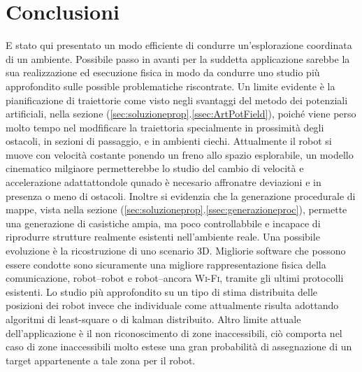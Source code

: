 \section{Conclusioni}
\label{sec:conclusioni}
E stato qui presentato un modo efficiente di condurre un'esplorazione coordinata
di un ambiente.
Possibile passo in avanti per la suddetta applicazione sarebbe la sua
realizzazione ed esecuzione fisica in modo da condurre uno studio più
approfondito sulle possible problematiche riscontrate.
Un limite evidente è la pianificazione di traiettorie come visto negli svantaggi
del metodo dei potenziali artificiali, nella sezione
(\ref{sec:soluzioneprop}.\ref{ssec:ArtPotField}), poiché viene perso molto tempo
nel modfificare la traiettoria specialmente in prossimità degli ostacoli,
in sezioni di passaggio, e in ambienti ciechi.
Attualmente il robot si muove con velocità costante ponendo un freno allo spazio
esplorabile, un modello cinematico milgiaore permetterebbe lo studio del cambio
di velocità e accelerazione adattattondole qunado è necesario affronatre
deviazioni e in presenza o meno di ostacoli.
Inoltre si evidenzia che la generazione procedurale di mappe, vista nella
sezione (\ref{sec:soluzioneprop}.\ref{ssec:generazioneproc}), permette una
generazione di casistiche ampia, ma poco controllabbile e incapace di riprodurre
strutture realmente esistenti nell'ambiente reale.
Una possibile evoluzione è la ricostruzione di uno scenario 3D.
Migliorie software che possono essere condotte sono sicuramente una migliore
rappresentazione fisica della comunicazione, robot--robot  e robot--ancora
\textsc{Wi-Fi}, tramite gli ultimi protocolli esistenti.
Lo studio più approfondito su un tipo di stima distribuita delle posizioni dei
robot invece che individuale come attualmente risulta adottando algoritmi di
least-square o di kalman distribuito.
Altro limite attuale dell'applicazione è il non riconoscimento di zone
inaccessibili, ciò comporta nel caso di zone inaccessibili molto estese una gran
probabilità di assegnazione di un target appartenente a tale zona per il robot.
